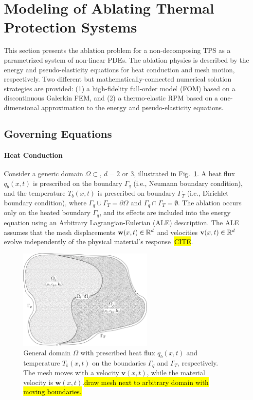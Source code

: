 \section{Modeling of Ablating Thermal Protection Systems}

This section presents the ablation problem for a non-decomposing TPS as a parametrized system of non-linear PDEs. The ablation physics is described by the energy and pseudo-elasticity equations for heat conduction and mesh motion, respectively. Two different but mathematically-connected numerical solution strategies are provided: (1) a high-fidelity full-order model (FOM) based on a discontinuous Galerkin FEM, and (2) a thermo-elastic RPM based on a one-dimensional approximation to the energy and pseudo-elasticity equations.

\subsection{Governing Equations}\label{sec_governing_equations}

\paragraph*{Heat Conduction} Consider a generic domain $\Omega\subset$, $d=2$ or $3$, illustrated in Fig.~\ref{fig_general_domain}. A heat flux $q_b(x,t)$ is prescribed on the boundary $\Gamma_q$ (i.e., Neumann boundary condition), and the temperature $T_b(x,t)$ is prescribed on boundary $\Gamma_T$ (i.e., Dirichlet boundary condition), where $\Gamma_q\cup\Gamma_T = \partial\Omega$ and $\Gamma_q\cap\Gamma_T = \emptyset$. The ablation occurs only on the heated boundary $\Gamma_q$, and its effects are included into the energy equation using an Arbitrary Lagrangian-Eulerian (ALE) description. The ALE assumes that the mesh displacements $\mathbf{w}(x,t)\in\mathbb{R}^d$ and velocities $\mathbf{v}(x,t)\in\mathbb{R}^{d}$ evolve independently of the physical material's response~\hl{CITE}.

\begin{figure}
    \centering
    \includegraphics[width=0.6\textwidth]{./figs/general_domain.png}
    \caption{General domain $\Omega$ with prescribed heat flux $q_b(x,t)$ and temperature $T_b(x,t)$ on the boundaries $\Gamma_q$ and $\Gamma_T$, respectively. The mesh moves with a velocity $\mathbf{v}(x,t)$, while the material velocity is $\mathbf{w}(x,t)$.\hl{draw mesh next to arbitrary domain with moving boundaries.}}
    \label{fig_general_domain}
\end{figure}

